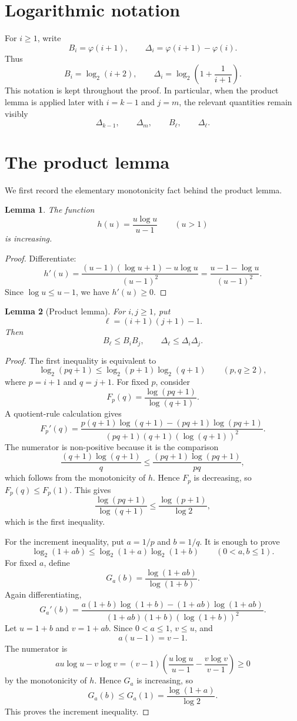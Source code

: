 \documentclass[11pt]{article}
\newcommand{\ph}{\varphi}
\newcommand{\Bell}[1]{B_{#1}}
\newcommand{\Delt}[1]{\Delta_{#1}}
\newtheorem*{lemma*}{Lemma}
\begin{document}
\section{Logarithmic notation}

For \(i\ge 1\), write
\[
 \Bell{i}=\ph(i+1),
 \qquad
 \Delt{i}=\ph(i+1)-\ph(i).
\]
Thus
\[
 \Bell{i}=\log_2(i+2),
 \qquad
 \Delt{i}=\log_2\left(1+\frac{1}{i+1}\right).
\]
This notation is kept throughout the proof.  In particular, when the
product lemma is applied later with \(i=k-1\) and \(j=m\), the relevant
quantities remain visibly
\[
 \Delt{k-1},\qquad \Delt{m},\qquad \Bell{\ell},\qquad \Delt{\ell}.
\]

\section{The product lemma}

We first record the elementary monotonicity fact behind the product lemma.

\begin{lemma*}
The function
\[
 h(u)=\frac{u\log u}{u-1}
 \qquad (u>1)
\]
is increasing.
\end{lemma*}

\begin{proof}
Differentiate:
\[
 h'(u)
 =
 \frac{(u-1)(\log u+1)-u\log u}{(u-1)^2}
 =
 \frac{u-1-\log u}{(u-1)^2}.
\]
Since \(\log u\le u-1\), we have \(h'(u)\ge 0\).
\end{proof}

\begin{lemma*}[Product lemma]
For \(i,j\ge 1\), put
\[
 \ell=(i+1)(j+1)-1.
\]
Then
\[
 \Bell{\ell}\le \Bell{i}\Bell{j},
 \qquad
 \Delt{\ell}\le \Delt{i}\Delt{j}.
\]
\end{lemma*}

\begin{proof}
The first inequality is equivalent to
\[
 \log_2(pq+1)
 \le
 \log_2(p+1)\log_2(q+1)
 \qquad(p,q\ge 2),
\]
where \(p=i+1\) and \(q=j+1\).  For fixed \(p\), consider
\[
 F_p(q)=\frac{\log(pq+1)}{\log(q+1)}.
\]
A quotient-rule calculation gives
\[
 F_p'(q)
 =
 \frac{
 p(q+1)\log(q+1)-(pq+1)\log(pq+1)
 }{(pq+1)(q+1)(\log(q+1))^2}.
\]
The numerator is non-positive because it is the comparison
\[
 \frac{(q+1)\log(q+1)}{q}
 \le
 \frac{(pq+1)\log(pq+1)}{pq},
\]
which follows from the monotonicity of \(h\).  Hence \(F_p\) is decreasing,
so \(F_p(q)\le F_p(1)\).  This gives
\[
 \frac{\log(pq+1)}{\log(q+1)}
 \le
 \frac{\log(p+1)}{\log 2},
\]
which is the first inequality.

For the increment inequality, put \(a=1/p\) and \(b=1/q\).  It is enough to
prove
\[
 \log_2(1+ab)
 \le
 \log_2(1+a)\log_2(1+b)
 \qquad(0<a,b\le 1).
\]
For fixed \(a\), define
\[
 G_a(b)=\frac{\log(1+ab)}{\log(1+b)}.
\]
Again differentiating,
\[
 G_a'(b)
 =
 \frac{
 a(1+b)\log(1+b)-(1+ab)\log(1+ab)
 }{(1+ab)(1+b)(\log(1+b))^2}.
\]
Let \(u=1+b\) and \(v=1+ab\).  Since \(0<a\le 1\), \(v\le u\), and
\[
 a(u-1)=v-1.
\]
The numerator is
\[
 a u\log u-v\log v
 =
 (v-1)\left(
 \frac{u\log u}{u-1}
 -
 \frac{v\log v}{v-1}
 \right)\ge 0
\]
by the monotonicity of \(h\).  Hence \(G_a\) is increasing, so
\[
 G_a(b)\le G_a(1)=\frac{\log(1+a)}{\log 2}.
\]
This proves the increment inequality.
\end{proof}
\end{document}
